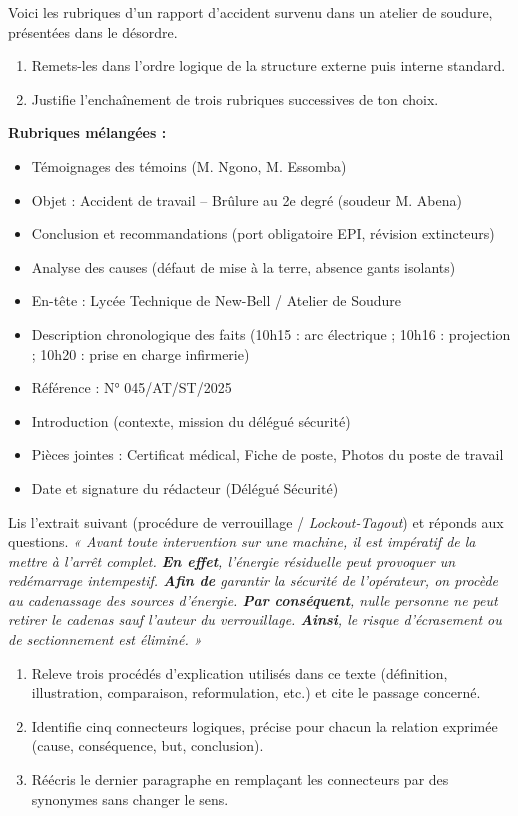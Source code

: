 \documentclass[11pt]{article}
\begin{document}
\begin{exercice}
Voici les rubriques d'un rapport d'accident survenu dans un atelier de soudure, présentées dans le désordre. 
\begin{enumerate}
    \item Remets-les dans l'ordre logique de la structure externe puis interne standard.
    \item Justifie l'enchaînement de trois rubriques successives de ton choix.
\end{enumerate}
\textbf{Rubriques mélangées :}
\begin{itemize}
    \item Témoignages des témoins (M. Ngono, M. Essomba)
    \item Objet : Accident de travail – Brûlure au 2e degré (soudeur M. Abena)
    \item Conclusion et recommandations (port obligatoire EPI, révision extincteurs)
    \item Analyse des causes (défaut de mise à la terre, absence gants isolants)
    \item En-tête : Lycée Technique de New-Bell / Atelier de Soudure
    \item Description chronologique des faits (10h15 : arc électrique ; 10h16 : projection ; 10h20 : prise en charge infirmerie)
    \item Référence : N° 045/AT/ST/2025
    \item Introduction (contexte, mission du délégué sécurité)
    \item Pièces jointes : Certificat médical, Fiche de poste, Photos du poste de travail
    \item Date et signature du rédacteur (Délégué Sécurité)
\end{itemize}
\end{exercice}

\begin{exercice}
Lis l'extrait suivant (procédure de verrouillage / \emph{Lockout-Tagout}) et réponds aux questions.
\textit{« Avant toute intervention sur une machine, il est impératif de la mettre à l'arrêt complet. \textbf{En effet}, l'énergie résiduelle peut provoquer un redémarrage intempestif. \textbf{Afin de} garantir la sécurité de l'opérateur, on procède au cadenassage des sources d'énergie. \textbf{Par conséquent}, nulle personne ne peut retirer le cadenas sauf l'auteur du verrouillage. \textbf{Ainsi}, le risque d'écrasement ou de sectionnement est éliminé. »}
\begin{enumerate}
    \item Releve trois procédés d'explication utilisés dans ce texte (définition, illustration, comparaison, reformulation, etc.) et cite le passage concerné.
    \item Identifie cinq connecteurs logiques, précise pour chacun la relation exprimée (cause, conséquence, but, conclusion).
    \item Réécris le dernier paragraphe en remplaçant les connecteurs par des synonymes sans changer le sens.
\end{enumerate}
\end{exercice}
\end{document}
